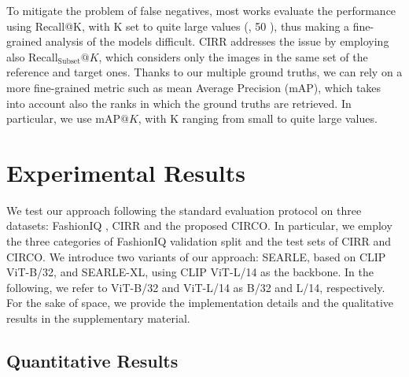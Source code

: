 \documentclass[10pt,twocolumn,letterpaper]{article}
\newcommand{\method}{SEARLE\xspace}
\begin{document}
To mitigate the problem of false negatives, most works evaluate the performance using Recall@K, with K set to quite large values (, 50 \cite{wu2021fashion}), thus making a fine-grained analysis of the models difficult. CIRR addresses the issue by employing also Recall$_{\text{Subset}}@K$, which considers only the images in the same set of the reference and target ones. Thanks to our multiple ground truths, we can rely on a more fine-grained metric such as mean Average Precision (mAP), which takes into account also the ranks in which the ground truths are retrieved. In particular, we use mAP$@K$, with K ranging from small to quite large values.



\section{Experimental Results} \label{sec:experimental_results}
We test our approach following the standard evaluation protocol \cite{baldrati2022conditioned, liu2021image} on three datasets: FashionIQ \cite{wu2021fashion}, CIRR \cite{liu2021image} and the proposed CIRCO. In particular, we employ the three categories of FashionIQ validation split and the test sets of CIRR and CIRCO. We introduce two variants of our approach: \method, based on CLIP ViT-B/32, and \method-XL, using CLIP ViT-L/14 as the backbone.
In the following, we refer to ViT-B/32 and ViT-L/14 as B/32 and L/14, respectively. For the sake of space, we provide the implementation details and the qualitative results in the supplementary material.

\subsection{Quantitative Results}
\end{document}
